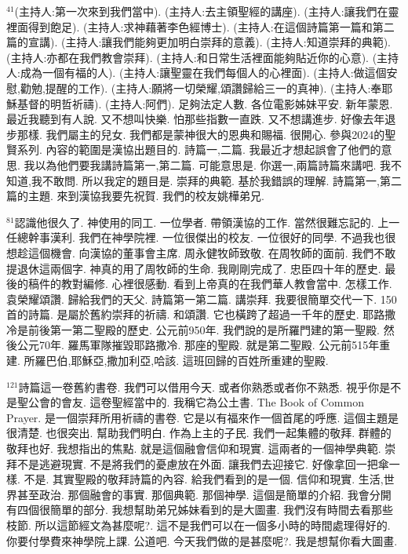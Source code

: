 \documentclass{book}
\begin{document}
$^{41}$(主持人:第一次來到我們當中).
(主持人:去主領聖經的講座).
(主持人:讓我們在靈裡面得到飽足).
(主持人:求神藉著李色經博士).
(主持人:在這個詩篇第一篇和第二篇的宣講).
(主持人:讓我們能夠更加明白崇拜的意義).
(主持人:知道崇拜的典範).
(主持人:亦都在我們教會崇拜).
(主持人:和日常生活裡面能夠貼近你的心意).
(主持人:成為一個有福的人).
(主持人:讓聖靈在我們每個人的心裡面).
(主持人:做這個安慰,勸勉,提醒的工作).
(主持人:願將一切榮耀,頌讚歸給三一的真神).
(主持人:奉耶穌基督的明哲祈禱).
(主持人:阿們).
足夠法定人數.
各位電影姊妹平安.
新年蒙恩.
最近我聽到有人說.
又不想叫快樂.
怕那些指數一直跌.
又不想講進步.
好像去年退步那樣.
我們屬主的兒女.
我們都是蒙神很大的恩典和賜福.
很開心.
參與2024的聖賢系列.
內容的範圍是漢協出題目的.
詩篇一,二篇.
我最近才想起誤會了他們的意思.
我以為他們要我講詩篇第一,第二篇.
可能意思是.
你選一,兩篇詩篇來講吧.
我不知道,我不敢問.
所以我定的題目是.
崇拜的典範.
基於我錯誤的理解.
詩篇第一,第二篇的主題.
來到漢協我要先祝賀.
我們的校友姚樺弟兄.

$^{81}$認識他很久了.
神使用的同工.
一位學者.
帶領漢協的工作.
當然很難忘記的.
上一任總幹事漢利.
我們在神學院裡.
一位很傑出的校友.
一位很好的同學.
不過我也很想趁這個機會.
向漢協的董事會主席.
周永健牧師致敬.
在周牧師的面前.
我們不敢提退休這兩個字.
神真的用了周牧師的生命.
我剛剛完成了.
忠臣四十年的歷史.
最後的稿件的教對編修.
心裡很感動.
看到上帝真的在我們華人教會當中.
怎樣工作.
袁榮耀頌讚.
歸給我們的天父.
詩篇第一第二篇.
講崇拜.
我要很簡單交代一下.
150首的詩篇.
是屬於舊約崇拜的祈禱.
和頌讚.
它也橫跨了超過一千年的歷史.
耶路撒冷是前後第一第二聖殿的歷史.
公元前950年.
我們說的是所羅門建的第一聖殿.
然後公元70年.
羅馬軍隊摧毀耶路撒冷.
那座的聖殿.
就是第二聖殿.
公元前515年重建.
所羅巴伯,耶穌亞,撒加利亞,哈該.
這班回歸的百姓所重建的聖殿.

$^{121}$詩篇這一卷舊約書卷.
我們可以借用今天.
或者你熟悉或者你不熟悉.
視乎你是不是聖公會的會友.
這卷聖經當中的.
我稱它為公土書.
The Book of Common Prayer.
是一個崇拜所用祈禱的書卷.
它是以有福來作一個首尾的呼應.
這個主題是很清楚.
也很突出.
幫助我們明白.
作為上主的子民.
我們一起集體的敬拜.
群體的敬拜也好.
我想指出的焦點.
就是這個融會信仰和現實.
這兩者的一個神學典範.
崇拜不是逃避現實.
不是將我們的憂慮放在外面.
讓我們去迎接它.
好像拿回一把傘一樣.
不是.
其實聖殿的敬拜詩篇的內容.
給我們看到的是一個.
信仰和現實.
生活,世界甚至政治.
那個融會的事實.
那個典範.
那個神學.
這個是簡單的介紹.
我會分開有四個很簡單的部分.
我想幫助弟兄姊妹看到的是大圖畫.
我們沒有時間去看那些枝節.
所以這節經文為甚麼呢?.
這不是我們可以在一個多小時的時間處理得好的.
你要付學費來神學院上課.
公道吧.
今天我們做的是甚麼呢?.
我是想幫你看大圖畫.
\end{document}
